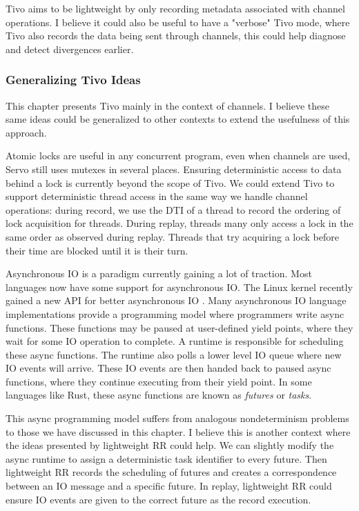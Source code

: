 Tivo aims to be lightweight by only recording metadata associated with channel operations. I believe it could also be useful to have a "verbose" Tivo mode, where Tivo also records the data being sent through channels, this could help diagnose and detect divergences earlier.

\subsubsection{Generalizing Tivo Ideas}
This chapter presents Tivo mainly in the context of channels. I believe these same ideas could be generalized to other contexts to extend the usefulness of this approach.

Atomic locks are useful in any concurrent program, even when channels are used, Servo still uses mutexes in several places. Ensuring deterministic access to data behind a lock is currently beyond the scope of Tivo. We could extend Tivo to support deterministic thread access in the same way we handle channel operations: during record, we use the DTI of a thread to record the ordering of lock acquisition for threads. During replay, threads many only access a lock in the same order as observed during replay. Threads that try acquiring a lock before their time are blocked until it is their turn.

Asynchronous IO is a paradigm currently gaining a lot of traction. Most languages now have some support for asynchronous IO. The Linux kernel recently gained a new API for better asynchronous IO \cite{io-uring}. Many asynchronous IO language implementations provide a programming model where programmers write async functions. These functions may be paused at user-defined yield points, where they wait for some IO operation to complete. A runtime is responsible for scheduling these async functions. The runtime also polls a lower level IO queue where new IO events will arrive. These IO events are then handed back to paused async functions, where they continue executing from their yield point. In some languages like Rust, these async functions are known as \textit{futures} or \textit{tasks}.

This async programming model suffers from analogous nondeterminism problems to those we have discussed in this chapter. I believe this is another context where the ideas presented by lightweight RR could help. We can slightly modify the async runtime to assign a deterministic task identifier to every future. Then lightweight RR records the scheduling of futures and creates a correspondence between an IO message and a specific future. In replay, lightweight RR could ensure IO events are given to the correct future as the record execution.